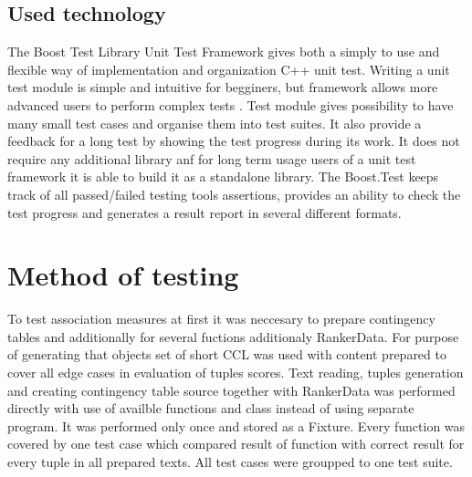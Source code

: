 \subsection{Used technology}\label{test_boost}
The Boost Test Library Unit Test Framework gives both a simply to use and flexible way of implementation and organization C++ unit test. 
Writing a unit test module is simple and intuitive for begginers, but framework allows more advanced users to perform complex tests \cite{boost}. 
Test module gives possibility to have many small test cases and organise them into test suites. It also provide a feedback for a long test by 
showing the test progress during its work. It does not require any additional library anf for long term usage users of a unit test framework 
it is able to build it as a standalone library. The Boost.Test keeps track of all passed/failed testing tools assertions, 
provides an ability to check the test progress and generates a result report in several different formats.

\section{Method of testing}
To test association measures at first it was neccesary to prepare contingency tables and additionally for several fuctions additionaly RankerData. 
For purpose of generating that objects set of short CCL was used with content prepared to cover all edge cases in evaluation of tuples scores. 
Text reading, tuples generation and creating contingency table source together with RankerData was performed directly with use of availble functions 
and class instead of using separate program. It was performed only once and stored as a Fixture. Every function was covered by one test case which 
compared result of function with correct result for every tuple in all prepared texts. All test cases were groupped to one test suite.


